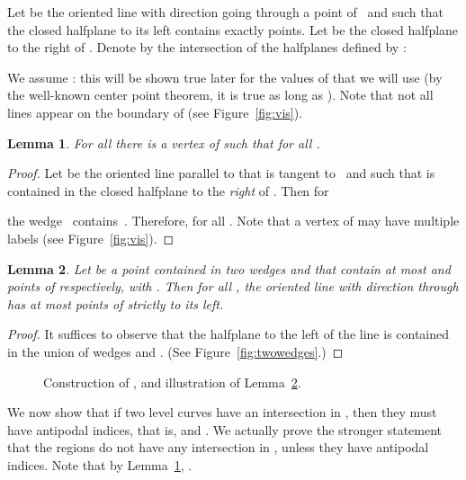 \documentclass[english,11pt]{article}
\newtheorem{lemma}{Lemma}
\begin{document}
Let  be the oriented line with
direction  going through a point of~
and such that the closed halfplane to its left
contains exactly  points.
Let  be the closed halfplane to the right of .
Denote by   the intersection of the  halfplanes defined by :

We assume : this will be shown true later for the
values of  that we will use (by the well-known center point theorem, it is true as long as ). Note that not all lines 
appear on the boundary of  (see Figure~\ref{fig:vis}).

\begin{lemma}
\label{lem:vis}
For all  there is a vertex  of  such that
 for all .
\end{lemma}
\begin{proof}
Let  be the oriented line parallel to  that is tangent to~ and such that  is contained in the closed halfplane to the {\em right} of .
Then for 
 
the wedge~ contains~. Therefore,  for all .
Note  that a vertex of  may have multiple labels  (see Figure~\ref{fig:vis}).
\end{proof}

\begin{lemma}\label{lem:twowedges}
Let  be a point contained in two wedges  and
 that  contain at most  and  points of  respectively, with . 
Then for all , the oriented line
with direction  through  has at most  points
of  strictly to its left.
\end{lemma}
\begin{proof}
It suffices to observe that the halfplane to the left of the line is contained in the union of  wedges  and .
(See Figure~\ref{fig:twowedges}.)
\end{proof}

\begin{figure}[htb]
\begin{center}
\hskip 1cm
\end{center}
\caption{Construction of , and illustration of Lemma~\ref{lem:twowedges}.}
\end{figure}

We now show that if two level curves have an intersection in , then they must have antipodal indices, that is,  and . 
We actually prove the stronger statement that the regions  do not have any intersection
in , unless they have antipodal indices.
Note that by Lemma~\ref{lem:vis}, 
.
\end{document}
